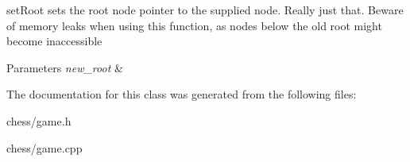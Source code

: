 set\-Root sets the root node pointer to the supplied node. Really just that. Beware of memory leaks when using this function, as nodes below the old root might become inaccessible 


\begin{DoxyParams}{Parameters}
{\em new\-\_\-root} & \\
\hline
\end{DoxyParams}


The documentation for this class was generated from the following files\-:\begin{DoxyCompactItemize}
\item 
chess/game.\-h\item 
chess/game.\-cpp\end{DoxyCompactItemize}

